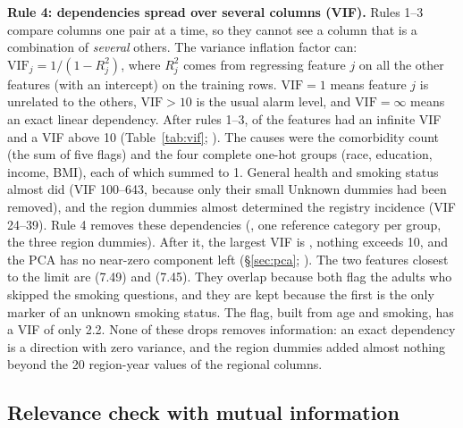\textbf{Rule 4: dependencies spread over several columns (VIF).} Rules 1--3 compare columns one pair at a time, so they cannot see a column that is a combination of \emph{several} others. The variance inflation factor can: $\mathrm{VIF}_j = 1 / (1 - R^2_j)$, where $R^2_j$ comes from regressing feature $j$ on all the other features (with an intercept) on the training rows. $\mathrm{VIF} = 1$ means feature $j$ is unrelated to the others, $\mathrm{VIF} > 10$ is the usual alarm level, and $\mathrm{VIF} = \infty$ means an exact linear dependency. After rules 1--3, \nInfVIF of the \nFeaturesBefore features had an infinite VIF and \nVIFaboveTenBefore a VIF above 10 (Table~\ref{tab:vif}; ). The causes were the comorbidity count (the sum of five flags) and the four complete one-hot groups (race, education, income, BMI), each of which summed to 1. General health and smoking status almost did (VIF 100--643, because only their small Unknown dummies had been removed), and the region dummies almost determined the registry incidence (VIF 24--39). Rule 4 removes these dependencies (, one reference category per group, the three region dummies). After it, the largest VIF is \maxVIFshort, nothing exceeds 10, and the PCA has no near-zero component left (\S\ref{sec:pca}; ). The two features closest to the limit are  (7.49) and  (7.45). They overlap because both flag the adults who skipped the smoking questions, and they are kept because the first is the only marker of an unknown smoking status. The  flag, built from age and smoking, has a VIF of only 2.2. None of these drops removes information: an exact dependency is a direction with zero variance, and the region dummies added almost nothing beyond the 20 region-year values of the regional columns.

\begin{table}[htbp]
\centering\small
\caption{Variance inflation factor of every feature after rules 1--3 (\nFeaturesBefore features) and after rule 4 (\nFeatures features), on training rows; one-hot groups are summarised by their range. $\infty$ = exact linear dependency.}\label{tab:vif}

\end{table}

\subsection{Relevance check with mutual information}\label{sec:mi}

